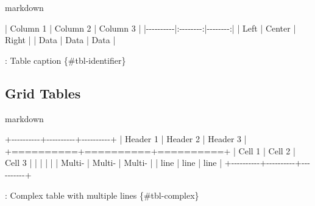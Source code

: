 \documentclass[
  11pt,
  letterpaper,
]{book}
\newenvironment{Shaded}{\begin{snugshade}}{\end{snugshade}}
\newcommand{\AlertTok}[1]{\textcolor[rgb]{0.68,0.00,0.00}{#1}}
\newcommand{\NormalTok}[1]{\textcolor[rgb]{0.00,0.23,0.31}{#1}}
\newcommand{\PreprocessorTok}[1]{\textcolor[rgb]{0.68,0.00,0.00}{#1}}
\begin{document}
markdown

\begin{Shaded}
\begin{Highlighting}[]
\PreprocessorTok{|}\NormalTok{ Column 1 }\PreprocessorTok{|}\NormalTok{ Column 2 }\PreprocessorTok{|}\NormalTok{ Column 3 }\PreprocessorTok{|}
\PreprocessorTok{|{-}{-}{-}{-}{-}{-}{-}{-}{-}{-}|:{-}{-}{-}{-}{-}{-}{-}{-}:|{-}{-}{-}{-}{-}{-}{-}{-}:|}
\PreprocessorTok{|}\NormalTok{ Left     }\PreprocessorTok{|}\NormalTok{ Center   }\PreprocessorTok{|}\NormalTok{ Right   }\PreprocessorTok{|}
\PreprocessorTok{|}\NormalTok{ Data     }\PreprocessorTok{|}\NormalTok{ Data     }\PreprocessorTok{|}\NormalTok{ Data    }\PreprocessorTok{|}

\NormalTok{: Table caption \{\#tbl{-}identifier\}}
\end{Highlighting}
\end{Shaded}

\subsection*{Grid Tables}\label{grid-tables}

markdown

\begin{Shaded}
\begin{Highlighting}[]
\NormalTok{+{-}{-}{-}{-}{-}{-}{-}{-}{-}{-}+{-}{-}{-}{-}{-}{-}{-}{-}{-}{-}+{-}{-}{-}{-}{-}{-}{-}{-}{-}{-}+}
\PreprocessorTok{|}\NormalTok{ Header 1 }\PreprocessorTok{|}\NormalTok{ Header 2 }\PreprocessorTok{|}\NormalTok{ Header 3 }\PreprocessorTok{|}
\NormalTok{+========}\AlertTok{==+==========+==}\NormalTok{========+}
\PreprocessorTok{|}\NormalTok{ Cell 1   }\PreprocessorTok{|}\NormalTok{ Cell 2   }\PreprocessorTok{|}\NormalTok{ Cell 3   }\PreprocessorTok{|}
\PreprocessorTok{|}          \PreprocessorTok{|}          \PreprocessorTok{|}          \PreprocessorTok{|}
\PreprocessorTok{|}\NormalTok{ Multi{-}   }\PreprocessorTok{|}\NormalTok{ Multi{-}   }\PreprocessorTok{|}\NormalTok{ Multi{-}   }\PreprocessorTok{|}
\PreprocessorTok{|}\NormalTok{ line     }\PreprocessorTok{|}\NormalTok{ line     }\PreprocessorTok{|}\NormalTok{ line     }\PreprocessorTok{|}
\NormalTok{+{-}{-}{-}{-}{-}{-}{-}{-}{-}{-}+{-}{-}{-}{-}{-}{-}{-}{-}{-}{-}+{-}{-}{-}{-}{-}{-}{-}{-}{-}{-}+}

\NormalTok{: Complex table with multiple lines \{\#tbl{-}complex\}}
\end{Highlighting}
\end{Shaded}
\end{document}
